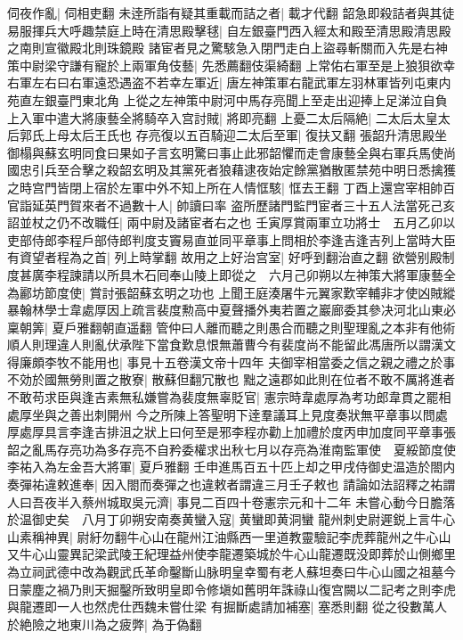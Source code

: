 伺夜作亂|{
	伺相吏翻}
未逹所詣有疑其重載而詰之者|{
	載才代翻}
韶急即殺詰者與其徒易服揮兵大呼趣禁庭上時在清思殿擊毬|{
	自左銀臺門西入經太和殿至清思殿清思殿之南則宣徽殿北則珠鏡殿}
諸宦者見之驚駭急入閉門走白上盜尋斬關而入先是右神策中尉梁守謙有寵於上兩軍角伎藝|{
	先悉薦翻伎渠綺翻}
上常佑右軍至是上狼狽欲幸右軍左右曰右軍遠恐遇盗不若幸左軍近|{
	唐左神策軍右龍武軍左羽林軍皆列屯東内苑直左銀臺門東北角}
上從之左神策中尉河中馬存亮聞上至走出迎捧上足涕泣自負上入軍中遣大將康藝全將騎卒入宫討賊|{
	將即亮翻}
上憂二太后隔絶|{
	二太后太皇太后郭氏上母太后王氏也}
存亮復以五百騎迎二太后至軍|{
	復扶又翻}
張韶升清思殿坐御榻與蘇玄明同食曰果如子言玄明驚曰事止此邪韶懼而走會康藝全與右軍兵馬使尚國忠引兵至合擊之殺韶玄明及其黨死者狼藉逮夜始定餘黨猶散匿禁苑中明日悉擒獲之時宫門皆閉上宿於左軍中外不知上所在人情恇駭|{
	恇去王翻}
丁酉上還宫宰相帥百官詣延英門賀來者不過數十人|{
	帥讀曰率}
盗所歷諸門監門宦者三十五人法當死己亥詔並杖之仍不改職任|{
	兩中尉及諸宦者右之也}
壬寅厚賞兩軍立功將士　五月乙卯以吏部侍郎李程戶部侍郎判度支竇易直並同平章事上問相於李逢吉逢吉列上當時大臣有資望者程為之首|{
	列上時掌翻}
故用之上好治宫室|{
	好呼到翻治直之翻}
欲營别殿制度甚廣李程諫請以所具木石囘奉山陵上即從之　六月己卯朔以左神策大將軍康藝全為酈坊節度使|{
	賞討張韶蘇玄明之功也}
上聞王庭湊屠牛元翼家歎宰輔非才使凶賊縱暴翰林學士韋處厚因上疏言裴度勲高中夏聲播外夷若置之巖廊委其參决河北山東必稟朝筭|{
	夏戶雅翻朝直遥翻}
管仲曰人離而聽之則愚合而聽之則聖理亂之本非有他術順人則理違人則亂伏承陛下當食歎息恨無蕭曹今有裴度尚不能留此馮唐所以謂漢文得廉頗李牧不能用也|{
	事見十五卷漢文帝十四年}
夫御宰相當委之信之親之禮之於事不効於國無勞則置之散寮|{
	散蘇但翻冗散也}
黜之遠郡如此則在位者不敢不厲將進者不敢苟求臣與逢吉素無私嫌嘗為裴度無辜貶官|{
	憲宗時韋處厚為考功郎韋貫之罷相處厚坐與之善出刺開州}
今之所陳上答聖明下逹羣議耳上見度奏狀無平章事以問處厚處厚具言李逢吉排沮之狀上曰何至是邪李程亦勸上加禮於度丙申加度同平章事張韶之亂馬存亮功為多存亮不自矜委權求出秋七月以存亮為淮南監軍使　夏綏節度使李祐入為左金吾大將軍|{
	夏戶雅翻}
壬申進馬百五十匹上却之甲戌侍御史温造於閤内奏彈祐違敕進奉|{
	因入閤而奏彈之也違敕者謂違三月壬子敕也}
請論如法詔釋之祐謂人曰吾夜半入蔡州城取吳元濟|{
	事見二百四十卷憲宗元和十二年}
未嘗心動今日膽落於温御史矣　八月丁卯朔安南奏黄蠻入寇|{
	黄蠻即黄洞蠻}
龍州刺史尉遲鋭上言牛心山素稱神異|{
	尉紆勿翻牛心山在龍州江油縣西一里道教靈驗記李虎葬龍州之牛心山又牛心山靈異記梁武陵王紀理益州使李龍遷築城於牛心山龍遷既没即葬於山側鄉里為立祠武德中改為觀武氏革命鑿斷山脉明皇幸蜀有老人蘇坦奏曰牛心山國之祖墓今日蒙塵之禍乃則天掘鑿所致明皇即令修塡如舊明年誅祿山復宫闕以二記考之則李虎與龍遷即一人也然虎仕西魏未嘗仕梁}
有掘斷處請加補塞|{
	塞悉則翻}
從之役數萬人於絶險之地東川為之疲弊|{
	為于偽翻}
